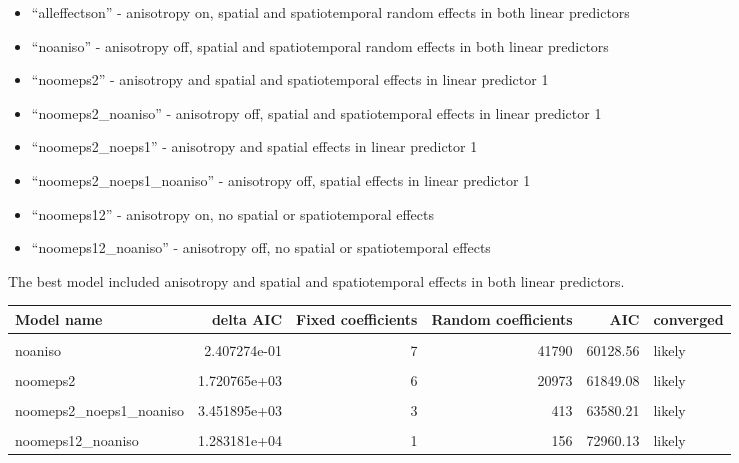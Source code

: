 \documentclass[
]{article}
\providecommand{\tightlist}{%
  \setlength{\itemsep}{0pt}\setlength{\parskip}{0pt}}
\let\origtable\table
\let\endorigtable\endtable
\renewenvironment{table}[1][2] {
    \expandafter\origtable\expandafter[H]
} {
    \endorigtable
}
\begin{document}
\begin{itemize}
\tightlist
\item
  ``alleffectson'' - anisotropy on, spatial and spatiotemporal random effects in both linear predictors
\item
  ``noaniso'' - anisotropy off, spatial and spatiotemporal random effects in both linear predictors
\item
  ``noomeps2'' - anisotropy and spatial and spatiotemporal effects in linear predictor 1
\item
  ``noomeps2\_noaniso'' - anisotropy off, spatial and spatiotemporal effects in linear predictor 1
\item
  ``noomeps2\_noeps1'' - anisotropy and spatial effects in linear predictor 1
\item
  ``noomeps2\_noeps1\_noaniso'' - anisotropy off, spatial effects in linear predictor 1
\item
  ``noomeps12'' - anisotropy on, no spatial or spatiotemporal effects
\item
  ``noomeps12\_noaniso'' - anisotropy off, no spatial or spatiotemporal effects
\end{itemize}

The best model included anisotropy and spatial and spatiotemporal effects in both linear predictors.

\begin{table}[H]

\caption{(\#tab:settings selection)Table 1: Model selection step 1 outcomes}
\centering
\begin{tabular}[t]{lrrrrl}
\toprule
Model name & delta AIC & Fixed coefficients & Random coefficients & AIC & converged\\
\midrule
\cellcolor{gray!10}{alleffectson} & \cellcolor{gray!10}{0.000000e+00} & \cellcolor{gray!10}{9} & \cellcolor{gray!10}{41790} & \cellcolor{gray!10}{60128.32} & \cellcolor{gray!10}{likely}\\
noaniso & 2.407274e-01 & 7 & 41790 & 60128.56 & likely\\
\cellcolor{gray!10}{noomeps2\_noaniso} & \cellcolor{gray!10}{1.720459e+03} & \cellcolor{gray!10}{4} & \cellcolor{gray!10}{20973} & \cellcolor{gray!10}{61848.78} & \cellcolor{gray!10}{likely}\\
noomeps2 & 1.720765e+03 & 6 & 20973 & 61849.08 & likely\\
\cellcolor{gray!10}{noomeps2\_noeps1} & \cellcolor{gray!10}{3.448233e+03} & \cellcolor{gray!10}{5} & \cellcolor{gray!10}{413} & \cellcolor{gray!10}{63576.55} & \cellcolor{gray!10}{likely}\\
\addlinespace
noomeps2\_noeps1\_noaniso & 3.451895e+03 & 3 & 413 & 63580.21 & likely\\
\cellcolor{gray!10}{noomeps12} & \cellcolor{gray!10}{1.283181e+04} & \cellcolor{gray!10}{1} & \cellcolor{gray!10}{156} & \cellcolor{gray!10}{72960.13} & \cellcolor{gray!10}{likely}\\
noomeps12\_noaniso & 1.283181e+04 & 1 & 156 & 72960.13 & likely\\
\bottomrule
\end{tabular}
\end{table}
\end{document}
